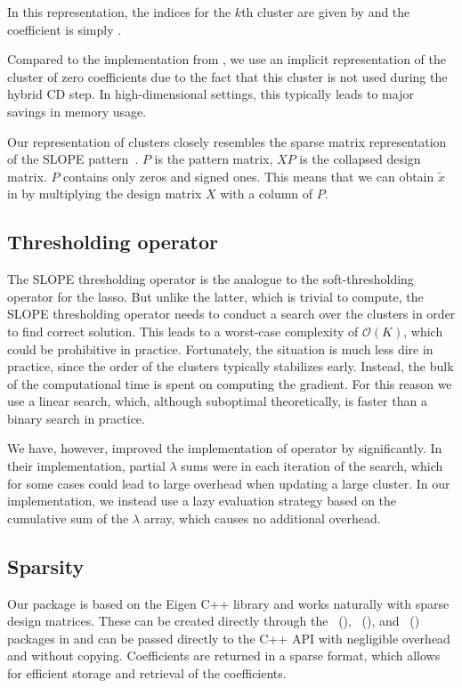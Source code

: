 \documentclass[article]{jss}
\let\Cref\crtCref
\begin{document}
In this representation, the indices for the \(k\)th cluster
are given by  and the coefficient is simply .

Compared to the implementation from \citet{larsson2023}, we use
an implicit representation of the cluster of zero coefficients due to
the fact that this cluster is not used during the hybrid CD step.
In high-dimensional settings, this typically leads to major savings in
memory usage.

Our representation of clusters closely resembles the sparse matrix
representation of the SLOPE pattern~\citep{schneider2022}. \(P\) is the pattern
matrix, \(X P\) is the collapsed design matrix. \(P\) contains only
zeros and signed ones. This means that we can obtain \(\tilde{x}\) in
\Cref{alg:hybrid} by multiplying the design matrix \(X\) with
a column of \(P\).

\subsection{Thresholding operator}

The SLOPE thresholding operator is the analogue to the
soft-thresholding operator for the lasso. But unlike the
latter, which is trivial to compute, the SLOPE thresholding operator
needs to conduct a search over the clusters in order to find correct
solution. This leads to a worst-case complexity of
\(\mathcal{O}(K)\), which could be prohibitive in practice.
Fortunately, the situation is much less dire in practice, since
the order of the clusters typically stabilizes early. Instead, the
bulk of the computational time is spent on computing the gradient.
For this reason we use a linear search, which, although suboptimal
theoretically, is faster than a binary search in practice.

We have, however, improved the implementation of
operator by \citet{larsson2023} significantly. In their implementation,
partial \(\lambda\) sums were in each iteration of the search, which
for some cases could lead to large overhead when updating
a large cluster. In our implementation, we instead use a lazy
evaluation strategy based on the cumulative sum of the \(\lambda\) array,
which causes no additional overhead.

\subsection{Sparsity}

Our package is based on the Eigen C++ library and works naturally with sparse
design matrices. These can be created directly through the
~(), ~(), and ~() packages in
and can be passed directly to the C++ API with negligible overhead
and without copying. Coefficients are returned in a sparse format, which
allows for efficient storage and retrieval of the coefficients.
\end{document}
